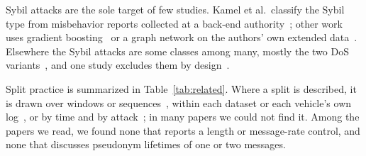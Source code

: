 Sybil attacks are the sole target of few studies. Kamel et al.\ classify the Sybil type from misbehavior reports
collected at a back-end authority~\cite{kamel2019misbehavior}; other work uses gradient boosting~\cite{fdil2024sybil}
or a graph network on the authors' own extended data~\cite{tang2025deep}. Elsewhere the Sybil attacks are some
classes among many, mostly the two DoS
variants~\cite{hamhoum2024mistralbsm,sedar2024knowledge,baharlouei2024evaluating}, and one study excludes them by
design~\cite{franceschini2025line}.

Split practice is summarized in Table~\ref{tab:related}. Where a split is described, it is drawn over windows or
sequences~\cite{youness2025vemisnet,franceschini2025line}, within each dataset or each vehicle's own
log~\cite{baharlouei2024evaluating,campos2025federated,demir2025distributed}, or by time and by
attack~\cite{sedar2024knowledge}; in many papers we could not find it. Among the papers we
read, we found none that reports a length or message-rate control, and none that discusses pseudonym lifetimes of
one or two messages.

